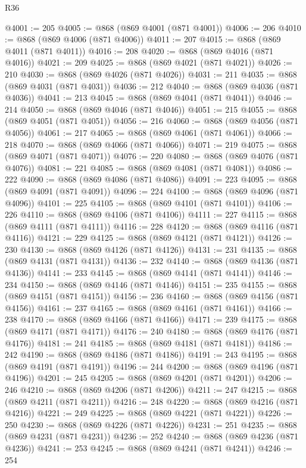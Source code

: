 \begin{lexlean}{R36}
\begin{coremodule}
@4001 := 205
@4005 := @868 (@869 @4001 (@871 @4001))
@4006 := 206
@4010 := @868 (@869 @4006 (@871 @4006))
@4011 := 207
@4015 := @868 (@869 @4011 (@871 @4011))
@4016 := 208
@4020 := @868 (@869 @4016 (@871 @4016))
@4021 := 209
@4025 := @868 (@869 @4021 (@871 @4021))
@4026 := 210
@4030 := @868 (@869 @4026 (@871 @4026))
@4031 := 211
@4035 := @868 (@869 @4031 (@871 @4031))
@4036 := 212
@4040 := @868 (@869 @4036 (@871 @4036))
@4041 := 213
@4045 := @868 (@869 @4041 (@871 @4041))
@4046 := 214
@4050 := @868 (@869 @4046 (@871 @4046))
@4051 := 215
@4055 := @868 (@869 @4051 (@871 @4051))
@4056 := 216
@4060 := @868 (@869 @4056 (@871 @4056))
@4061 := 217
@4065 := @868 (@869 @4061 (@871 @4061))
@4066 := 218
@4070 := @868 (@869 @4066 (@871 @4066))
@4071 := 219
@4075 := @868 (@869 @4071 (@871 @4071))
@4076 := 220
@4080 := @868 (@869 @4076 (@871 @4076))
@4081 := 221
@4085 := @868 (@869 @4081 (@871 @4081))
@4086 := 222
@4090 := @868 (@869 @4086 (@871 @4086))
@4091 := 223
@4095 := @868 (@869 @4091 (@871 @4091))
@4096 := 224
@4100 := @868 (@869 @4096 (@871 @4096))
@4101 := 225
@4105 := @868 (@869 @4101 (@871 @4101))
@4106 := 226
@4110 := @868 (@869 @4106 (@871 @4106))
@4111 := 227
@4115 := @868 (@869 @4111 (@871 @4111))
@4116 := 228
@4120 := @868 (@869 @4116 (@871 @4116))
@4121 := 229
@4125 := @868 (@869 @4121 (@871 @4121))
@4126 := 230
@4130 := @868 (@869 @4126 (@871 @4126))
@4131 := 231
@4135 := @868 (@869 @4131 (@871 @4131))
@4136 := 232
@4140 := @868 (@869 @4136 (@871 @4136))
@4141 := 233
@4145 := @868 (@869 @4141 (@871 @4141))
@4146 := 234
@4150 := @868 (@869 @4146 (@871 @4146))
@4151 := 235
@4155 := @868 (@869 @4151 (@871 @4151))
@4156 := 236
@4160 := @868 (@869 @4156 (@871 @4156))
@4161 := 237
@4165 := @868 (@869 @4161 (@871 @4161))
@4166 := 238
@4170 := @868 (@869 @4166 (@871 @4166))
@4171 := 239
@4175 := @868 (@869 @4171 (@871 @4171))
@4176 := 240
@4180 := @868 (@869 @4176 (@871 @4176))
@4181 := 241
@4185 := @868 (@869 @4181 (@871 @4181))
@4186 := 242
@4190 := @868 (@869 @4186 (@871 @4186))
@4191 := 243
@4195 := @868 (@869 @4191 (@871 @4191))
@4196 := 244
@4200 := @868 (@869 @4196 (@871 @4196))
@4201 := 245
@4205 := @868 (@869 @4201 (@871 @4201))
@4206 := 246
@4210 := @868 (@869 @4206 (@871 @4206))
@4211 := 247
@4215 := @868 (@869 @4211 (@871 @4211))
@4216 := 248
@4220 := @868 (@869 @4216 (@871 @4216))
@4221 := 249
@4225 := @868 (@869 @4221 (@871 @4221))
@4226 := 250
@4230 := @868 (@869 @4226 (@871 @4226))
@4231 := 251
@4235 := @868 (@869 @4231 (@871 @4231))
@4236 := 252
@4240 := @868 (@869 @4236 (@871 @4236))
@4241 := 253
@4245 := @868 (@869 @4241 (@871 @4241))
@4246 := 254

\end{coremodule}
\end{lexlean}
